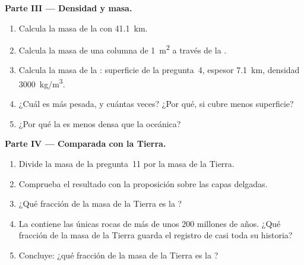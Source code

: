 \begin{problem}
\medskip
\noindent\textbf{Parte III --- Densidad y masa.}
\begin{enumerate}[resume]
  \item Calcula la masa de la  con \qty{41.1}{km}.
  \item Calcula la masa de una columna de \qty{1}{m^2} a través de la
        .
  \item Calcula la masa de la : superficie de la pregunta~4,
        espesor \qty{7.1}{km}, densidad \qty{3000}{kg/m^3}.
  \item ¿Cuál es más pesada, y cuántas veces? ¿Por qué, si cubre menos
        superficie?
  \item ¿Por qué la  es menos densa que la oceánica?
\end{enumerate}

\medskip
\noindent\textbf{Parte IV --- Comparada con la Tierra.}
\begin{enumerate}[resume]
  \item Divide la masa de la pregunta~11 por la masa de la Tierra.
  \item Comprueba el resultado con la proposición sobre las capas delgadas.
  \item ¿Qué fracción de la masa de la Tierra es la ?
  \item La  contiene las únicas rocas de más de unos 200
        millones de años. ¿Qué fracción de la masa de la Tierra guarda el
        registro de casi toda su historia?
  \item Concluye: ¿qué fracción de la masa de la Tierra es la ?
\end{enumerate}
\end{problem}
